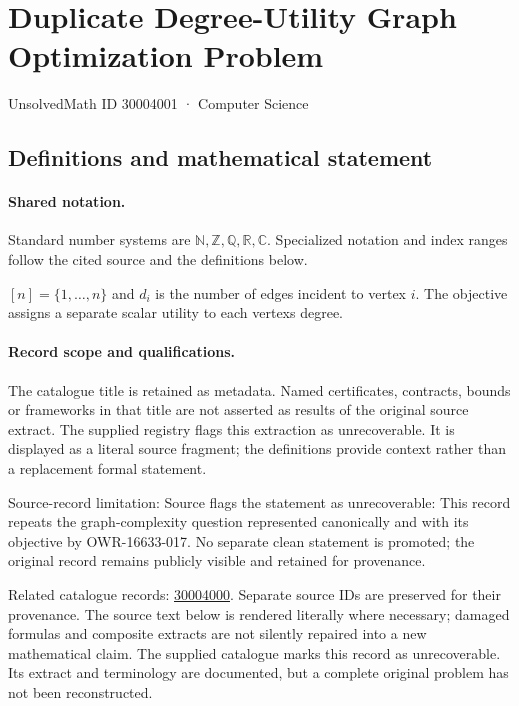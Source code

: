 \documentclass[11pt]{article}
\begin{document}
\setcounter{section}{30004000}
\section{Duplicate Degree-Utility Graph Optimization Problem}\label{30004001}
{\small\sffamily UnsolvedMath ID 30004001 · Computer Science}
\subsection{Definitions and mathematical statement}

\paragraph{Shared notation.}Standard number systems are $\mathbb N,\mathbb Z,\mathbb Q,\mathbb R,\mathbb C$. Specialized notation and index ranges follow the cited source and the definitions below.


$[n]=\{1,\ldots,n\}$ and $d_i$ is the number of edges incident to vertex $i$. The objective assigns a separate scalar utility to each vertex\textquotesingle s degree.
\paragraph{Record scope and qualifications.}
The catalogue title is retained as metadata. Named certificates, contracts, bounds or frameworks in that title are not asserted as results of the original source extract.
The supplied registry flags this extraction as unrecoverable. It is displayed as a literal source fragment; the definitions provide context rather than a replacement formal statement.

Source-record limitation: Source flags the statement as unrecoverable: This record repeats the graph-complexity question represented canonically and with its objective by OWR-16633-017. No separate clean statement is promoted; the original record remains publicly visible and retained for provenance.

Related catalogue records: \href{https://mehmetmars7.github.io/Erdosproblems-llm-hunter/problem.html?type=open_problems&id=30004000}{30004000}. Separate source IDs are preserved for their provenance.
The source text below is rendered literally where necessary; damaged formulas and composite extracts are not silently repaired into a new mathematical claim.
The supplied catalogue marks this record as unrecoverable. Its extract and terminology are documented, but a complete original problem has not been reconstructed.
\end{document}
